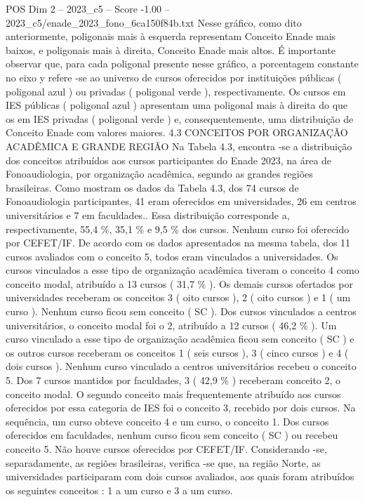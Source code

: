 \begin{textsample}{POS Dim 2 – 2023\_c5 – Score -1.00 – 2023\_c5/enade\_2023\_fono\_6ca150f84b.txt}
Nesse gráfico, como dito anteriormente, poligonais mais à esquerda representam Conceito Enade mais baixos, e poligonais mais à direita, Conceito Enade mais altos.
É importante observar que, para cada poligonal presente nesse gráfico, a porcentagem constante no eixo y refere -se ao universo de cursos oferecidos por instituições públicas ( poligonal azul ) ou privadas ( poligonal verde ), respectivamente.
Os cursos em IES públicas ( poligonal azul ) apresentam uma poligonal mais à direita do que os em IES privadas ( poligonal verde ) e, consequentemente, uma distribuição de Conceito Enade com valores maiores. 4.3 CONCEITOS POR ORGANIZAÇÃO ACADÊMICA E GRANDE REGIÃO Na Tabela 4.3, encontra -se a distribuição dos conceitos atribuídos aos cursos participantes do Enade 2023, na área de Fonoaudiologia, por organização acadêmica, segundo as grandes regiões brasileiras.
Como mostram os dados da Tabela 4.3, dos 74 cursos de Fonoaudiologia participantes, 41 eram oferecidos em universidades, 26 em centros universitários e 7 em faculdades..
Essa distribuição corresponde a, respectivamente, 55,4 \%, 35,1 \% e 9,5 \% dos cursos.
Nenhum curso foi oferecido por CEFET/IF.
De acordo com os dados apresentados na mesma tabela, dos 11 cursos avaliados com o conceito 5, todos eram vinculados a universidades.
Os cursos vinculados a esse tipo de organização acadêmica tiveram o conceito 4 como conceito modal, atribuído a 13 cursos ( 31,7 \% ).
Os demais cursos ofertados por universidades receberam os conceitos 3 ( oito cursos ), 2 ( oito cursos ) e 1 ( um curso ).
Nenhum curso ficou sem conceito ( SC ).
Dos cursos vinculados a centros universitários, o conceito modal foi o 2, atribuído a 12 cursos ( 46,2 \% ).
Um curso vinculado a esse tipo de organização acadêmica ficou sem conceito ( SC ) e os outros cursos receberam os conceitos 1 ( seis cursos ), 3 ( cinco cursos ) e 4 ( dois cursos ).
Nenhum curso vinculado a centros universitários recebeu o conceito 5.
Dos 7 cursos mantidos por faculdades, 3 ( 42,9 \% ) receberam conceito 2, o conceito modal.
O segundo conceito mais frequentemente atribuído aos cursos oferecidos por essa categoria de IES foi o conceito 3, recebido por dois cursos.
Na sequência, um curso obteve conceito 4 e um curso, o conceito 1.
Dos cursos oferecidos em faculdades, nenhum curso ficou sem conceito ( SC ) ou recebeu conceito 5.
Não houve cursos oferecidos por CEFET/IF.
Considerando -se, separadamente, as regiões brasileiras, verifica -se que, na região Norte, as universidades participaram com dois cursos avaliados, aos quais foram atribuídos os seguintes conceitos : 1 a um curso e 3 a um curso.

\end{textsample}
